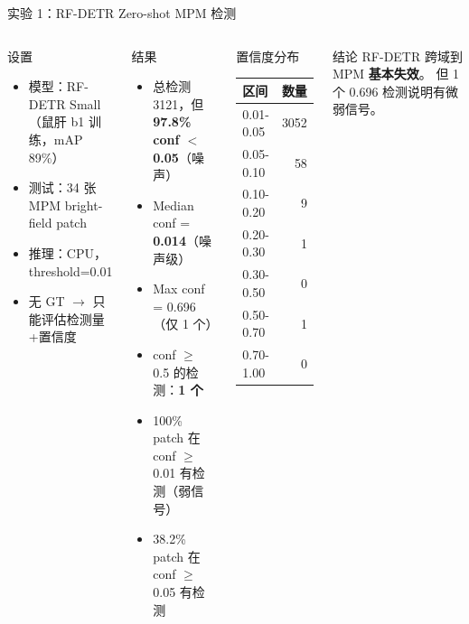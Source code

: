 \documentclass[aspectratio=169, 10pt]{beamer}
\begin{document}
\begin{frame}{实验 1：RF-DETR Zero-shot MPM 检测}
  \begin{columns}[T]
    \begin{block}{设置}
      \begin{itemize}
        \item 模型：RF-DETR Small（鼠肝 b1 训练，mAP 89\%）
        \item 测试：34 张 MPM bright-field patch
        \item 推理：CPU，threshold=0.01
        \item 无 GT $\to$ 只能评估检测量+置信度
      \end{itemize}
    \end{block}
    \begin{alertblock}{结果}
      \begin{itemize}
        \item 总检测 3121，但 \textbf{97.8\% conf $<$ 0.05}（噪声）
        \item Median conf = \textbf{0.014}（噪声级）
        \item Max conf = 0.696（仅 1 个）
        \item conf $\geq$ 0.5 的检测：\textbf{1 个}
        \item 100\% patch 在 conf $\geq$ 0.01 有检测（弱信号）
        \item 38.2\% patch 在 conf $\geq$ 0.05 有检测
      \end{itemize}
    \end{alertblock}
    \begin{block}{置信度分布}
      \scriptsize
      \begin{tabular}{lr}
        \toprule
        \textbf{区间} & \textbf{数量} \\
        \midrule
        0.01-0.05 & 3052 \\
        0.05-0.10 & 58 \\
        0.10-0.20 & 9 \\
        0.20-0.30 & 1 \\
        0.30-0.50 & 0 \\
        0.50-0.70 & 1 \\
        0.70-1.00 & 0 \\
        \bottomrule
      \end{tabular}
    \end{block}
    \begin{alertblock}{结论}
      RF-DETR 跨域到 MPM \textbf{基本失效}。
      但 1 个 0.696 检测说明有微弱信号。
    \end{alertblock}
  \end{columns}
\end{frame}
\end{document}
